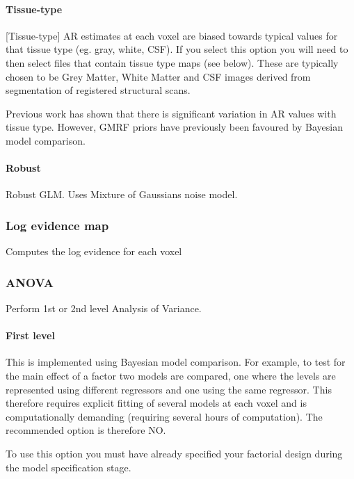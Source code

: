\paragraph{Tissue-type}

[Tissue-type] AR estimates at each voxel are biased towards typical values for that tissue type (eg. gray, white, CSF). If you select this option you will need to then select files that contain tissue type maps (see below). These are typically chosen to be Grey Matter, White Matter and CSF images derived from segmentation of registered structural scans.

Previous work has shown that there is significant variation in AR values with tissue type. However, GMRF priors have previously been favoured by Bayesian model comparison.

\paragraph{Robust}

Robust GLM. Uses Mixture of Gaussians noise model.

\subsubsection{Log evidence map}

Computes the log evidence for each voxel

\subsubsection{ANOVA}

Perform 1st or 2nd level Analysis of Variance.

\paragraph{First level}

This is implemented using Bayesian model comparison. For example, to test for the main effect of a factor two models are compared, one where the levels are represented using different regressors and one using the same regressor. This therefore requires explicit fitting of several models at each voxel and is computationally demanding (requiring several hours of computation). The recommended option is therefore NO.

To use this option you must have already specified your factorial design during the model specification stage.

